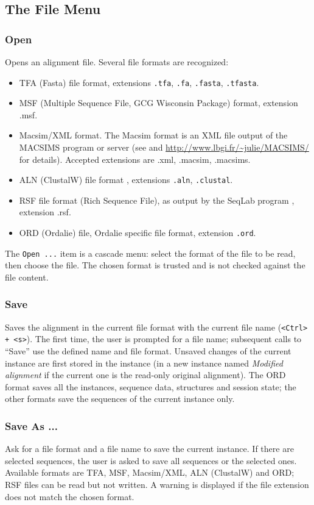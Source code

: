 \documentclass[a4paper]{article}
\begin{document}
\subsection{The File Menu}
\subsubsection{Open}
Opens an alignment file. Several file formats are recognized:
\begin{itemize}
\item TFA (Fasta) file format, extensions \texttt{.tfa}, \texttt{.fa}, \texttt{.fasta}, \texttt{.tfasta}.
\item MSF (Multiple Sequence File, GCG Wisconsin Package) format, extension .msf.
\item Macsim/XML format. The Macsim format is an XML file output of the MACSIMS program or server (see \cite{soft:macsims} and \url{http://www.lbgi.fr/~julie/MACSIMS/} for details). Accepted extensions are .xml, .macsim, .macsims.
\item ALN (ClustalW) file format \cite{soft:clustalw}, extensions \texttt{.aln}, \texttt{.clustal}.
\item RSF file format (Rich Sequence File), as output by the SeqLab program \cite{soft:seqlab}, extension .rsf.
\item ORD (Ordalie) file, Ordalie specific file format, extension \texttt{.ord}.
\end{itemize}

The \texttt{Open ...} item is a cascade menu: select the format of the file to be read, then choose the file. The chosen format is trusted and is not checked against the file content. 

\subsubsection{Save}
Saves the alignment in the current file format with the current file name (\texttt{<Ctrl> + <s>}). The first time, the user is prompted for a file name; subsequent calls to ``Save'' use the defined name and file format. Unsaved changes of the current instance are first stored in the instance (in a new instance named \textit{Modified alignment} if the current one is the read-only original alignment). The ORD format saves all the instances, sequence data, structures and session state; the other formats save the sequences of the current instance only.

\subsubsection{Save As ...}
Ask for a file format and a file name to save the current instance. If there are selected sequences, the user is asked to save all sequences or the selected ones. Available formats are TFA, MSF, Macsim/XML, ALN (ClustalW) and ORD; RSF files can be read but not written. A warning is displayed if the file extension does not match the chosen format.
\end{document}

